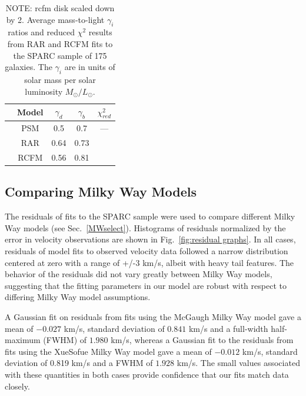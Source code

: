 \documentclass[reprint,%
 amsmath,amssymb,
 aps,
]{revtex4-1}
\begin{document}

    
    
    \begin{table}[h!]
        \centering
        \begin{tabular}{|c|c|c|c|c|}
        \hline
        &Model & $\gamma_d$ & $\gamma_b$& $\chi^2_{red}$ \\
        \hline
        \hline
           & PSM \cite{McGaugh2016RAR} & 0.5 &0.7&--- \\
            \hline
            \hline
         &   RAR	 &    0.64 &	0.73  & \\
         \hline
         &  RCFM   &  0.56 &	0.81&\\
           \hline
        \end{tabular}
        \caption{  {\color{teal}NOTE: rcfm disk scaled down by 2.}
          Average mass-to-light $\gamma_i$  ratios and reduced $\chi^2$  results from RAR and RCFM fits to the SPARC sample of 175 galaxies. The $\gamma_i$ are in units of  solar mass per solar luminosity $M_\odot/L_\odot$. }
        \label{tab:lobes}
    \end{table}
    
    
   \subsection{Comparing Milky Way Models} 
   
   
    The residuals of fits to the SPARC sample were used to compare different Milky Way models (see Sec.~\ref{MWselect}).  Histograms of residuals normalized by the error in velocity observations are shown in Fig.~\ref{fig:residual graphs}. 
     In all cases, residuals of model fits to observed velocity data followed a narrow distribution centered at zero with a range of +/-3 km/s, albeit with heavy tail features. The behavior of the residuals did not vary greatly between Milky Way models, suggesting that the fitting parameters in our model are robust with respect to differing Milky Way model assumptions.
    
    A Gaussian fit on residuals from fits using the McGaugh Milky Way model gave a mean of $-0.027$ km/s, standard deviation of $0.841$ km/s and a full-width half-maximum (FWHM) of $1.980$ km/s, whereas a Gaussian fit to the residuals from fits using the XueSofue Milky Way model gave a mean of $-0.012$ km/s, standard deviation of 0.819 km/s and a FWHM of  $1.928$ km/s. The small values associated with these quantities in both cases provide confidence that our fits match data closely.
    
\end{document}

